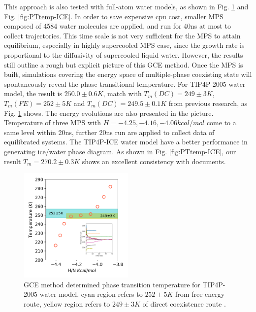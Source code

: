 \documentclass[aps,prl,twocolumn,superscriptaddress]{revtex4-1}
\begin{document}
This approach is also tested with full-atom water models, as shown in Fig. \ref{fig:PTtemp-2005} and Fig. \ref{fig:PTtemp-ICE}. In order to save expensive cpu cost, smaller MPS composed of 4584 water molecules are applied, and run for 40ns at most to collect trajectories. This time scale is not very sufficient for the MPS to attain equilibrium, especially in highly supercooled MPS case, since the growth rate is proportional to the diffusivity of supercooled liquid water\cite{Tanaka2003}. However, the results still outline a rough but explicit picture of this GCE method. Once the MPS is built, simulations covering the energy space of multiple-phase coexisting state will spontaneously reveal the phase transitional temperature. For TIP4P-2005 water model, the result is $250.0\pm0.6K$, match with $T_m(DC)=249\pm3K$, $T_m(FE)=252\pm5K$ and $T_m(DC)=249.5\pm0.1K$ from previous research\cite{Conde2013,Conde2017}, as Fig. \ref{fig:PTtemp-2005} shows. The energy evolutions are also presented in the picture. Temperature of three MPS with $H=-4.25,-4.16,-4.06 kcal/mol$ come to a same level within 20ns, further 20ns run are applied to collect data of equilibrated systems. The TIP4P-ICE water model have a better performance in generating ice/water phase diagram. As shown in Fig. \ref{fig:PTtemp-ICE}, our result $T_m=270.2\pm0.3K$ shows an excellent consistency with documents\cite{Conde2017,Abascal2005}.
 \begin{figure}[ht]
\centering{}\includegraphics[width=0.5\textwidth]{PTtemp-2005-insec.png} 
\caption{GCE method determined phase transition temperature for TIP4P-2005 water model. cyan region refers to $252\pm5K$ from free energy route, yellow region refers to $249\pm3K$ of direct coexistence route\cite{Conde2013} . 
\label{fig:PTtemp-2005}} 
\end{figure}
\end{document}
